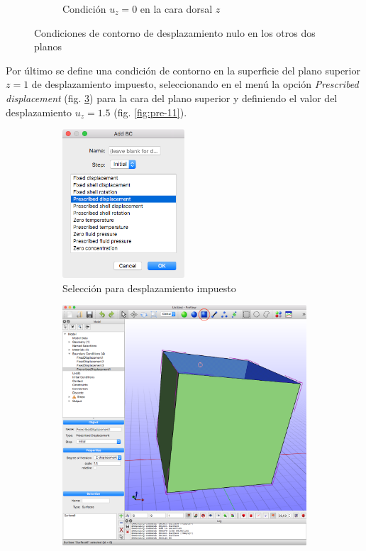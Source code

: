 \begin{figure}[!htp]
\begin{subfigure}[b]{0.48\textwidth}
\caption{Condición $u_{z}=0$ en la cara dorsal $z$}
\label{fig:pre-09}
\end{subfigure}
\caption{Condiciones de contorno de desplazamiento nulo en los otros dos planos}
\label{fig:pre-08-09}
\end{figure}

Por último se define una condición de contorno en la superficie del plano superior $z=1$ de desplazamiento impuesto, seleccionando en el menú la opción \emph{Prescribed displacement} (fig. \ref{fig:pre-10}) para la cara del plano superior y definiendo el valor del desplazamiento $u_{z}=1.5$ (fig. \ref{fig:pre-11}).
\begin{figure}[!htp]
\centering
\begin{subfigure}[b]{0.48\textwidth}
\centering
\includegraphics[width=0.5\textwidth]{figuras_3/scr-pre-10.png}
\caption{Selección para desplazamiento impuesto}
\label{fig:pre-10}
\end{subfigure}
\begin{subfigure}[b]{0.48\textwidth}
\includegraphics[width=\textwidth]{figuras_3/scr-pre-11m.png}

\end{subfigure}
\end{figure}
